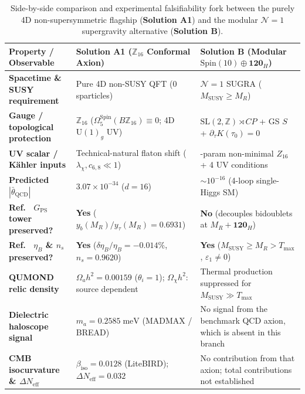 \documentclass[11pt,a4paper]{article}
\begin{document}
\begin{table}[t!]
\centering
\caption{Side-by-side comparison and experimental falsifiability fork between the purely 4D non-supersymmetric flagship (\textbf{Solution A1}) and the modular $\mathcal{N}=1$ supergravity alternative (\textbf{Solution B}).}
\label{tab:comparison}
\vspace{0.35em}
\renewcommand{\arraystretch}{1.18}
\begin{tabularx}{\textwidth}{>{\bfseries}l >{\raggedright\arraybackslash}X >{\raggedright\arraybackslash}X}
\toprule
Property / Observable & \textbf{Solution A1 ($\mathbb{Z}_{16}$ Conformal Axion)} & \textbf{Solution B (Modular $\mathrm{Spin}(10)\oplus\mathbf{120}_H$)} \\
\midrule
Spacetime \& SUSY requirement & Pure 4D non-SUSY QFT (0 sparticles) & $\mathcal{N}=1$ SUGRA ($M_{\mathrm{SUSY}} \ge M_R$) \\
Gauge / topological protection & $\mathbb{Z}_{16}$ ($\Omega_5^{\mathrm{Spin}}(B\mathbb{Z}_{16}) \equiv 0$; 4D $\mathrm{U}(1)_g$ UV) & $\mathrm{SL}(2,\mathbb{Z})\rtimes CP$ + GS $S$ + $\partial_\tau K(\tau_0)=0$ \\
UV scalar / K\"ahler inputs & Technical-natural flaton shift ($\lambda_\chi, c_{6,8} \ll 1$) & 26-param non-minimal $Z_{16}$ + 4 UV conditions \\
Predicted $|\bar{\theta}_{\mathrm{QCD}}|$ & $3.07\times 10^{-34}$ ($d = 16$) & $\sim 10^{-16}$ (4-loop single-Higgs SM) \\
Ref.~\cite{Olcsak2026Paper25} $G_{\mathrm{PS}}$ tower preserved? & \textbf{Yes} ($y_b(M_R)/y_\tau(M_R) = 0.6931$) & \textbf{No} (decouples bidoublets at $M_R + \mathbf{120}_H$) \\
Ref.~\cite{Olcsak2026Paper24} $\eta_B$ \& $n_s$ preserved? & \textbf{Yes} ($\delta\eta_B/\eta_B = -0.014\%$, $n_s = 0.9620$) & \textbf{Yes} ($M_{\mathrm{SUSY}} \ge M_R > T_{\max}$, $\varepsilon_1 \neq 0$) \\
QUMOND relic density & $\Omega_a h^2 = 0.00159$ ($\theta_i=1$); $\Omega_\chi h^2$: source dependent & Thermal production suppressed for $M_{\mathrm{SUSY}}\gg T_{\max}$ \\
Dielectric haloscope signal & $m_a = 0.2585\;\mathrm{meV}$ (MADMAX / BREAD) & No signal from the benchmark QCD axion, which is absent in this branch \\
CMB isocurvature \& $\Delta N_{\mathrm{eff}}$ & $\beta_{\mathrm{iso}} = 0.0128$ (LiteBIRD); $\Delta N_{\mathrm{eff}} = 0.032$ & No contribution from that axion; total contributions not established \\
\bottomrule
\end{tabularx}
\end{table}
\end{document}
